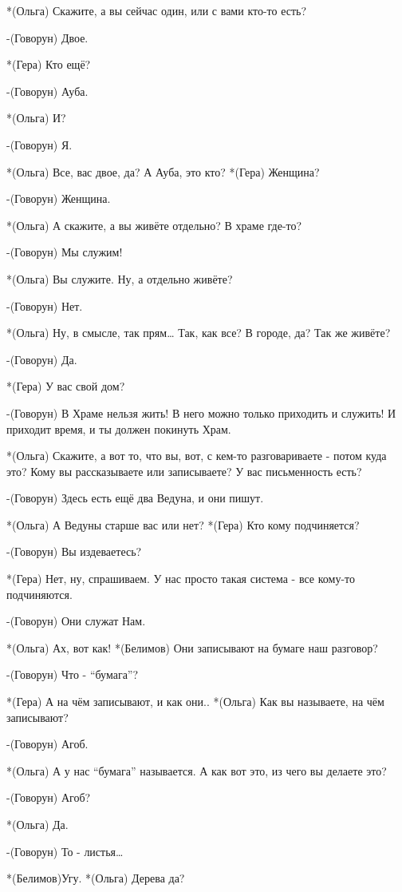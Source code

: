 *(Ольга) Скажите, а вы сейчас один, или с вами кто-то есть?

-(Говорун) Двое.

*(Гера) Кто ещё?

-(Говорун) Ауба.

*(Ольга) И?

-(Говорун) Я.

*(Ольга) Все, вас двое, да? А Ауба,  это кто?
*(Гера) Женщина?

-(Говорун) Женщина.

*(Ольга) А скажите, а вы живёте отдельно? В храме где-то?

-(Говорун) Мы служим!

*(Ольга) Вы служите. Ну, а отдельно живёте?

-(Говорун) Нет.

*(Ольга) Ну, в смысле, так прям… Так, как все? В городе, да? Так же живёте?

-(Говорун) Да.

*(Гера) У вас свой дом?

-(Говорун) В Храме нельзя жить! В него можно только приходить и служить! И приходит время, и ты должен покинуть Храм.

*(Ольга) Скажите, а вот то, что вы, вот, с кем-то разговариваете - потом куда это? Кому вы рассказываете или записываете? У вас письменность есть?

-(Говорун) Здесь есть ещё два Ведуна,  и они пишут.

*(Ольга) А Ведуны старше вас или нет?
*(Гера) Кто кому подчиняется?

-(Говорун) Вы издеваетесь?

*(Гера) Нет, ну, спрашиваем. У нас просто такая система - все кому-то подчиняются.

-(Говорун) Они служат Нам.

*(Ольга) Ах, вот как!
*(Белимов) Они записывают на бумаге наш разговор?

-(Говорун) Что - “бумага”?

*(Гера) А на чём записывают, и как они..
*(Ольга) Как вы называете, на чём записывают?

-(Говорун) Агоб.

*(Ольга) А у нас “бумага” называется. А как вот это, из чего вы делаете это?

-(Говорун) Агоб?

*(Ольга) Да.

-(Говорун) То - листья…

*(Белимов)Угу.
*(Ольга) Дерева да?

